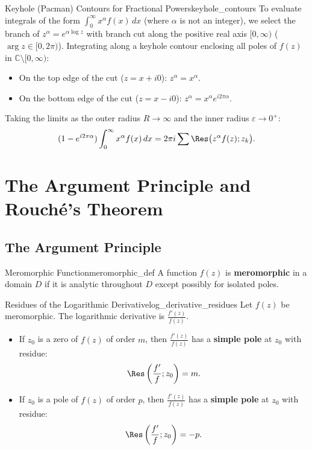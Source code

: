 \begin{proposition}{Keyhole (Pacman) Contours for Fractional Powers}{keyhole_contours}
To evaluate integrals of the form $\int_0^\infty x^\alpha f(x)\, dx$ (where $\alpha$ is not an integer), we select the branch of $z^\alpha = e^{\alpha \log z}$ with branch cut along the positive real axis $[0, \infty)$ ($\arg z \in [0, 2\pi)$).
Integrating along a keyhole contour enclosing all poles of $f(z)$ in $\mathbb{C} \setminus [0, \infty)$:
\begin{itemize}
    \item On the top edge of the cut ($z = x + i0$): $z^\alpha = x^\alpha$.
    \item On the bottom edge of the cut ($z = x - i0$): $z^\alpha = x^\alpha e^{i 2\pi\alpha}$.
\end{itemize}
Taking the limits as the outer radius $R \to \infty$ and the inner radius $\varepsilon \to 0^+$:
\begin{equation}
(1 - e^{i 2\pi\alpha}) \int_0^\infty x^\alpha f(x)\, dx = 2\pi i \sum \Res\big(z^\alpha f(z); z_k\big).
\end{equation}
\end{proposition}


\section{The Argument Principle and Rouché's Theorem}

\subsection{The Argument Principle}

\begin{definition}{Meromorphic Function}{meromorphic_def}
A function $f(z)$ is \textbf{meromorphic} in a domain $D$ if it is analytic throughout $D$ except possibly for isolated poles.
\end{definition}

\begin{proposition}{Residues of the Logarithmic Derivative}{log_derivative_residues}
Let $f(z)$ be meromorphic. The logarithmic derivative is $\frac{f'(z)}{f(z)}$.
\begin{itemize}
    \item If $z_0$ is a zero of $f(z)$ of order $m$, then $\frac{f'(z)}{f(z)}$ has a \textbf{simple pole} at $z_0$ with residue:
    \begin{equation}
    \Res\left(\frac{f'}{f}; z_0\right) = m.
    \end{equation}
    \item If $z_0$ is a pole of $f(z)$ of order $p$, then $\frac{f'(z)}{f(z)}$ has a \textbf{simple pole} at $z_0$ with residue:
    \begin{equation}
    \Res\left(\frac{f'}{f}; z_0\right) = -p.
    \end{equation}
\end{itemize}
\end{proposition}

